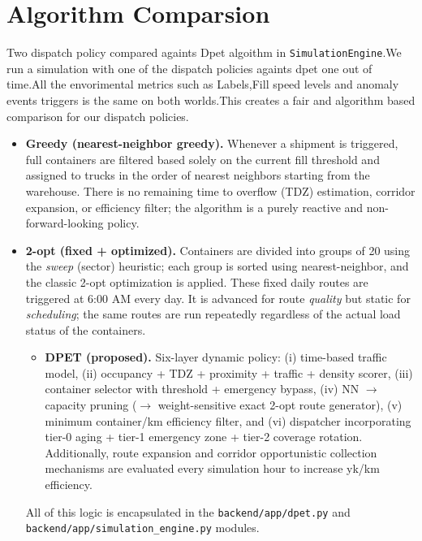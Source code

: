 \documentclass[12pt,a4paper]{report}
\begin{document}
\section{Algorithm Comparsion}
\label{sec:algoritmalar}

\indent Two dispatch policy  compared againts Dpet algoithm in \texttt{SimulationEngine}.We run a simulation with one of the dispatch policies againts dpet one out of time.All the envorimental metrics such as Labels,Fill speed levels and anomaly events triggers is the same on both worlds.This creates a fair and algorithm based comparison for our dispatch policies.

\begin{itemize}[leftmargin=*]
  \item \textbf{Greedy (nearest-neighbor greedy).} Whenever a shipment is triggered, full containers are filtered based solely on the current fill threshold and assigned to trucks in the order of nearest neighbors starting from the warehouse. There is no remaining time to overflow (TDZ) estimation, corridor expansion, or efficiency filter; the algorithm is a purely reactive and non-forward-looking policy.
  \item \textbf{2-opt (fixed + optimized).} Containers are divided into groups of 20 using the \textit{sweep} (sector) heuristic; each group is sorted using nearest-neighbor, and the classic 2-opt optimization is applied. These fixed daily routes are triggered at 6:00 AM every day. It is advanced for route \textit{quality} but static for \textit{scheduling}; the same routes are run repeatedly regardless of the actual load status of the containers.

  \begin{itemize}
    \item \textbf{DPET (proposed).} Six-layer dynamic policy: (i) time-based traffic model, (ii) occupancy + TDZ + proximity + traffic + density scorer, (iii) container selector with threshold + emergency bypass, (iv) NN $\rightarrow$ capacity pruning ($\rightarrow$ weight-sensitive exact 2-opt route generator), (v) minimum container/km efficiency filter, and (vi) dispatcher incorporating tier-0 aging + tier-1 emergency zone + tier-2 coverage rotation. Additionally, route expansion and corridor opportunistic collection mechanisms are evaluated every simulation hour to increase yk/km efficiency.
\end{itemize}

All of this logic is encapsulated in the \texttt{backend/app/dpet.py} and \texttt{backend/app/simulation\_engine.py} modules.


\end{itemize}
\end{document}
